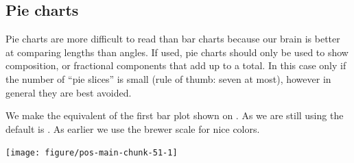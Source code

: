 \documentclass[krantz2]{krantz}\usepackage{knitr}%
\begin{document}
\subsection{Pie charts}

\begin{warningbox}
Pie charts are more difficult to read than bar charts because our brain is better at comparing lengths than angles. If used, pie charts should only be used to show composition, or fractional components that add up to a total. In this case only if the number of “pie slices” is small (rule of thumb: seven at most), however in general they are best avoided.
\end{warningbox}

We make the equivalent of the first bar plot shown on \pageref{example:plot:barplot}. As we are still using  the default is . As earlier we use the brewer scale for nice colors.

\begin{knitrout}\footnotesize
{}\color{fgcolor}\begin{kframe}
\begin{alltt}
\hlstd{(}  \hlstd{(} \hlstd{=} \hlstd{(}\hlstd{),}  \hlstd{=}  \hlopt{+}
  \hlstd{(} \hlstd{=} \hlstd{,}  \hlstd{=} \hlstd{)} \hlopt{+}
  \hlstd{(} \hlstd{=} \hlstd{)} \hlopt{+}
  \hlstd{()} \hlopt{+}
  \hlstd{(} \hlstd{=} \hlstd{)} \hlopt{+}
  \hlstd{(} \hlstd{=} \hlstd{,}  \hlstd{=} \hlstd{)}
\end{alltt}
\end{kframe}

{\centering \texttt{[image: figure/pos-main-chunk-51-1]} 

}



\end{knitrout}
\end{document}
